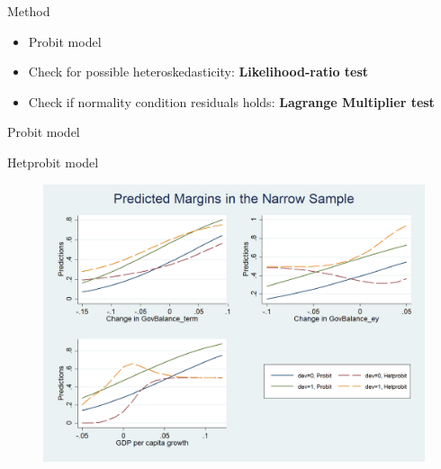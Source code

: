 \documentclass{beamer}
\begin{document}
\begin{frame}{Method}
\begin{itemize}
 \setlength\itemsep{1.6em}
    \item Probit model
    \item Check for possible heteroskedasticity: \textbf{Likelihood-ratio test}
    \item Check if normality condition residuals holds: \textbf{Lagrange Multiplier test}
\end{itemize}

\end{frame}
\begin{frame}{Probit model}
    
\end{frame}
\begin{frame}{Hetprobit model}
    
\end{frame}
\begin{frame}
    \begin{figure}[H]
    \centering
    \label{figure:margins}
    \centering
    \includegraphics[width=1\textwidth]{Predicted_Narrow.png}

\end{figure}

\end{frame}
\end{document}
